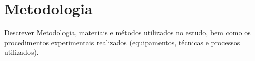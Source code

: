 \chapter{Metodologia}
\label{cap:03}

Descrever Metodologia, materiais e métodos utilizados no estudo, bem como os   procedimentos   experimentais   realizados (equipamentos, técnicas e processos utilizados).
